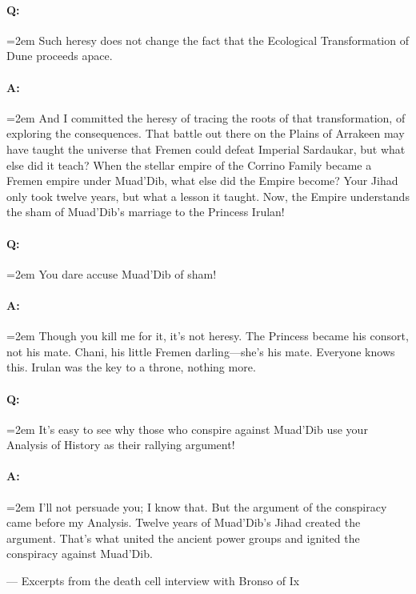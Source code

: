 \documentclass[a4paper, 12pt, oldfontcommands, final]{memoir}
\begin{document}
\paragraph{Q:} \hangindent=2em Such heresy does not change the fact that the Ecological Transformation of Dune proceeds apace.
\paragraph{A:} \hangindent=2em And I committed the heresy of tracing the roots of that transformation, of exploring the consequences. That battle out there on the Plains of Arrakeen may have taught the universe that Fremen could defeat Imperial Sardaukar, but what else did it teach? When the stellar empire of the Corrino Family became a Fremen empire under Muad'Dib, what else did the Empire become? Your Jihad only took twelve years, but what a lesson it taught. Now, the Empire understands the sham of Muad'Dib's marriage to the Princess Irulan!
\paragraph{Q:} \hangindent=2em You dare accuse Muad'Dib of sham!
\paragraph{A:} \hangindent=2em Though you kill me for it, it's not heresy. The Princess became his consort, not his mate. Chani, his little Fremen darling---she's his mate. Everyone knows this. Irulan was the key to a throne, nothing more.
\paragraph{Q:} \hangindent=2em It's easy to see why those who conspire against Muad'Dib use your Analysis of History as their rallying argument!
\paragraph{A:} \hangindent=2em I'll not persuade you; I know that. But the argument of the conspiracy came before my Analysis. Twelve years of Muad'Dib's Jihad created the argument. That's what united the ancient power groups and ignited the conspiracy against Muad'Dib.
\begin{adjustwidth}{1.5em}{}
  \vspace{10pt}
  --- Excerpts from the death cell interview with Bronso of Ix
\end{adjustwidth}
\end{document}
